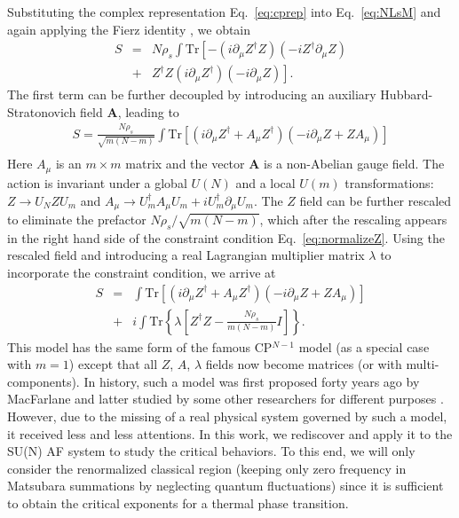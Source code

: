 \documentclass[aps,twocolumn,superscriptaddress]{revtex4-1}
\newcommand{\bea}{\begin{eqnarray}}
\newcommand{\eea}{\end{eqnarray}}
\newcommand{\bA}{\mathbf{A}}
\begin{document}
Substituting the complex representation Eq.~\ref{eq:cprep} into Eq.~\ref{eq:NLsM} and again applying the Fierz identity
, we obtain \bea S &=& N\rho_s \int\mathrm{Tr}\left[-(i\partial_\mu Z^\dagger Z) (-iZ^\dag \partial_\mu
Z) \right. \nonumber\\  &+& \left. Z^\dag Z (i\partial_\mu Z^\dagger)(-i\partial_\mu Z)\right] .\eea The first term can
be further decoupled by introducing an auxiliary Hubbard-Stratonovich field $\bA$, leading to \bea \label{eq:cpNm0} S=\frac{N\rho_s}{\sqrt{m(N-m)}}\int
\mathrm{Tr}\left[ (i\partial_\mu Z^\dag+A_\mu Z^\dag)(-i\partial_\mu Z+ZA_\mu)  \right] \nonumber\\ \eea 
Here $A_\mu$ is an $m\times m$ matrix and the vector $\bA$ is a non-Abelian gauge field. The action is invariant under a global $U(N)$ and a local $U(m)$ transformations: $Z\rightarrow U_NZU_m$ and $A_\mu\rightarrow U_m^\dag A_\mu U_m+iU_m^\dag\partial_\mu U_m$. \cite{macfarlane1979,duerksen1981}
The $Z$ field can be further rescaled to eliminate the prefactor
$N\rho_s/\sqrt{m(N-m)}$, which after the rescaling appears in the right hand side of the constraint condition Eq.~\ref{eq:normalizeZ}. Using the
rescaled field and introducing a real Lagrangian multiplier matrix $\lambda$ to incorporate the constraint condition, we
arrive at \bea \label{eq:cpNm} S&=&\int \mathrm{Tr}\left[ (i\partial_\mu Z^\dag+A_\mu Z^\dag)(-i\partial_\mu Z+ZA_\mu)
\right] \nonumber \\ &+& i\int \mathrm{Tr}\left\{\lambda\left[Z^\dag Z-\frac{N\rho_s}{m(N-m)}I\right]\right\} .
\eea 
This model has the same form of the famous CP$^{N-1}$ model (as a special case with $m=1$) except that all $Z$, $A$, $\lambda$ fields now become matrices (or with multi-components). 
In history, such a model was first proposed forty
years ago by MacFarlane \cite{macfarlane1979} and latter studied by some other researchers for different purposes
\cite{hikami1980,duerksen1981,maharana1983}. However, due to the missing of a real physical system governed by such a
model, it received less and less attentions. In this work, we rediscover and apply it to the SU(N) AF system to study
the critical behaviors. To this end, we will only consider the renormalized classical region (keeping only zero frequency in Matsubara summations by neglecting quantum fluctuations) since it is sufficient to obtain the critical exponents for a thermal phase transition. \cite{chubukov1994,starykh1994,irkhin1996}
\end{document}
